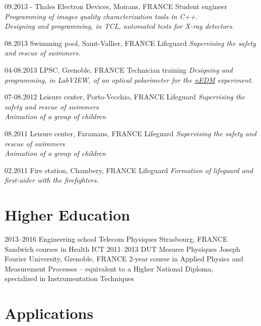 \documentclass[]{Elie-cv}
\begin{document}
\begin{entrylist}
  \entry
    {09.2013 -}
    {Thales Electron Devices, Moirans, FRANCE}
    {Student engineer}
    {\emph{Programming of images quality characterization tools in C++. \\
				Designing and programming, in TCL, automated tests for X-ray detectors.}}
   
   \entry
    {08.2013}
    {Swimming pool, Saint-Vallier, FRANCE}
    {Lifeguard}
    {\emph{Supervising the safety and rescue of swimmers.}}
   
   \entry
    {04-08.2013}
    {LPSC, Grenoble, FRANCE}
    {Technician training}
    {\emph{Designing and programming, in LabVIEW, of an optical polarimeter for the {\href{http://nedm.web.psi.ch/}{nEDM}} experiment.}}
   
   \entry
    {07-08.2012}
    {Leisure center, Porto-Vecchio, FRANCE}
    {Lifeguard}
    {\emph{Supervising the safety and rescue of swimmers \\
    			Animation of a group of children}}

   \entry
    {08.2011}
    {Leisure center, Faramans, FRANCE}
    {Lifeguard}
    {\emph{Supervising the safety and rescue of swimmers \\
    			Animation of a group of children}}
   
   \entry
    {02.2011}
    {Fire station, Chambery, FRANCE}
    {Lifeguard}
    {\emph{Formation of lifeguard and first-aider with the firefighters.}}
      
\end{entrylist}

\section{Higher Education}

\begin{entrylist}
  \entry
    {2013–2016}
    {Engineering school}
    {Telecom Physiques Strasbourg, FRANCE}
    {Sandwich courses in Health ICT}
  \entry
    {2011–2013}
    {DUT Mesures Physiques}
    {Joseph Fourier University, Grenoble, FRANCE}
    {2-year course in Applied Physics and Measurement Processes – equivalent to a Higher National Diploma,\\
    			specialized in Instrumentation Techniques}
\end{entrylist}

\section{Applications}
\end{document}
